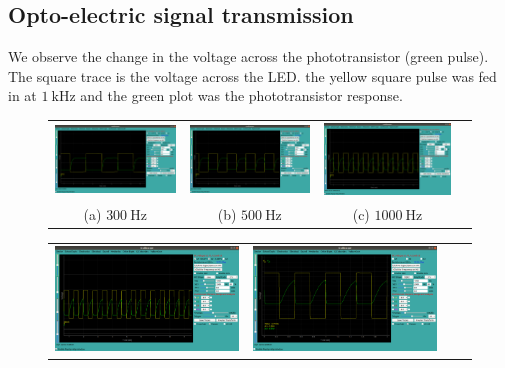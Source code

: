 \documentclass[%
 aip,
 amsmath,amssymb,
 reprint, floatfix%
]{revtex4-1}
\begin{document}
    \subsection{Opto-electric signal transmission}
    We observe the change in the voltage across the phototransistor (green pulse). The square trace is the voltage across the LED. the yellow square pulse was fed in at $\SI{1}{\kilo \hertz}$ and the green plot was the phototransistor response.
    \begin{figure}[htp]
    \centering
    \begin{tabular}{cccc}
    \includegraphics[width=.325\textwidth]{Figures/photo_300.png} &
    \includegraphics[width=.325\textwidth]{Figures/phto_500.png} &
    \includegraphics[width=.325\textwidth]{Figures/photo_1000.png} \\
    (a) $\SI{300}{\hertz}$ & (b) $\SI{500}{\hertz}$ & (c) $\SI{1000}{\hertz}$  \\[6pt]
    \end{tabular}
    \medskip
    \begin{tabular}{cccc}
    \includegraphics[width=.325\textwidth]{Figures/photo_1500.png}&
    \includegraphics[width=.325\textwidth]{Figures/photo_2000.png}&

\end{tabular}
\end{figure}
\end{document}
